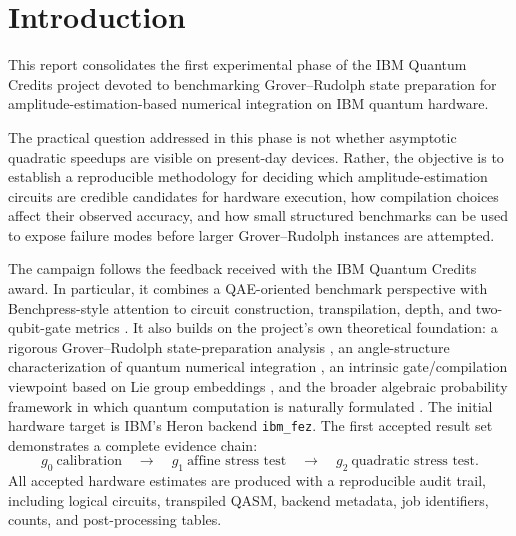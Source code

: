 \section{Introduction}
\label{sec:introduction}

This report consolidates the first experimental phase of the IBM Quantum
Credits project devoted to benchmarking Grover--Rudolph state preparation for
amplitude-estimation-based numerical integration on IBM quantum hardware.

The practical question addressed in this phase is not whether asymptotic
quadratic speedups are visible on present-day devices. Rather, the objective is
to establish a reproducible methodology for deciding which amplitude-estimation
circuits are credible candidates for hardware execution, how compilation choices
affect their observed accuracy, and how small structured benchmarks can be used
to expose failure modes before larger Grover--Rudolph instances are attempted.

The campaign follows the feedback received with the IBM Quantum Credits award.
In particular, it combines a QAE-oriented benchmark perspective
\cite{maronese2024qae} with Benchpress-style attention to circuit construction,
transpilation, depth, and two-qubit-gate metrics \cite{nation2025benchpress}.
It also builds on the project's own theoretical foundation: a rigorous
Grover--Rudolph state-preparation analysis \cite{falco2026grproof}, an
angle-structure characterization of quantum numerical integration
\cite{chinesta2026encoding}, an intrinsic gate/compilation viewpoint based on
Lie group embeddings \cite{falco2026liegates}, and the broader algebraic
probability framework in which quantum computation is naturally formulated
\cite{falco2026algebraicprobability}.
The initial hardware target is IBM's Heron backend \texttt{ibm\_fez}. The first
accepted result set demonstrates a complete evidence chain:
\[
  g_0\ \text{calibration}
  \quad\longrightarrow\quad
  g_1\ \text{affine stress test}
  \quad\longrightarrow\quad
  g_2\ \text{quadratic stress test}.
\]
All accepted hardware estimates are produced with a reproducible audit trail,
including logical circuits, transpiled QASM, backend metadata, job identifiers,
counts, and post-processing tables.
